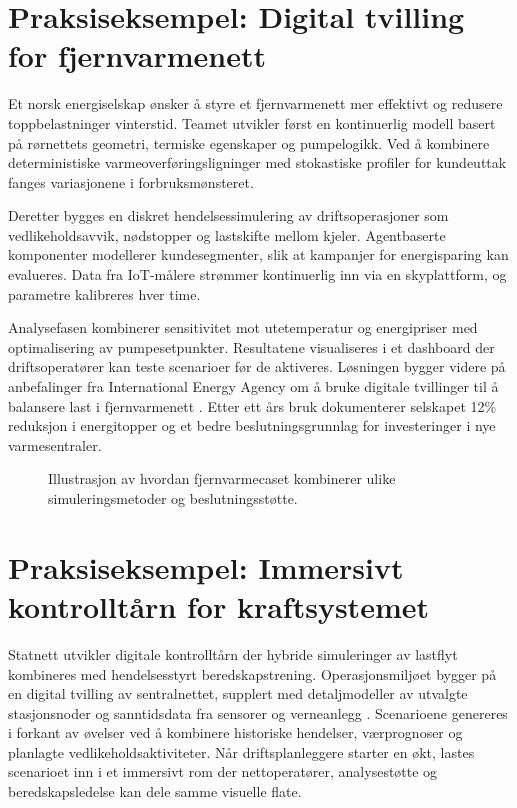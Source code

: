 \section{Praksiseksempel: Digital tvilling for fjernvarmenett}
Et norsk energiselskap ønsker å styre et fjernvarmenett mer effektivt og redusere toppbelastninger vinterstid. Teamet utvikler først en kontinuerlig modell basert på rørnettets geometri, termiske egenskaper og pumpelogikk. Ved å kombinere deterministiske varmeoverføringsligninger med stokastiske profiler for kundeuttak fanges variasjonene i forbruksmønsteret.

Deretter bygges en diskret hendelsessimulering av driftsoperasjoner som vedlikeholdsavvik, nødstopper og lastskifte mellom kjeler. Agentbaserte komponenter modellerer kundesegmenter, slik at kampanjer for energisparing kan evalueres. Data fra IoT-målere strømmer kontinuerlig inn via en skyplattform, og parametre kalibreres hver time.

Analysefasen kombinerer sensitivitet mot utetemperatur og energipriser med optimalisering av pumpesetpunkter. Resultatene visualiseres i et dashboard der driftsoperatører kan teste scenarioer før de aktiveres. Løsningen bygger videre på anbefalinger fra International Energy Agency om å bruke digitale tvillinger til å balansere last i fjernvarmenett \citep{iea2021district}. Etter ett års bruk dokumenterer selskapet 12\% reduksjon i energitopper og et bedre beslutningsgrunnlag for investeringer i nye varmesentraler.

\begin{figure}[htbp]
    \centering
    \caption{Illustrasjon av hvordan fjernvarmecaset kombinerer ulike simuleringsmetoder og beslutningsstøtte.}
    \label{fig:kap04-fjernvarmecase}
\end{figure}

\section{Praksiseksempel: Immersivt kontrolltårn for kraftsystemet}
Statnett utvikler digitale kontrolltårn der hybride simuleringer av lastflyt kombineres med hendelsesstyrt beredskapstrening. Operasjonsmiljøet bygger på en digital tvilling av sentralnettet, supplert med detaljmodeller av utvalgte stasjonsnoder og sanntidsdata fra sensorer og verneanlegg \citep{statnett2024kontrolltarn}. Scenarioene genereres i forkant av øvelser ved å kombinere historiske hendelser, værprognoser og planlagte vedlikeholdsaktiviteter. Når driftsplanleggere starter en økt, lastes scenarioet inn i et immersivt rom der nettoperatører, analysestøtte og beredskapsledelse kan dele samme visuelle flate.

